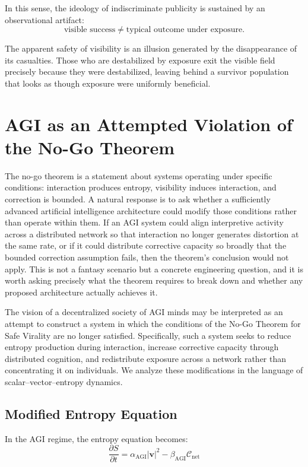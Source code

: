 \documentclass[12pt,a4paper]{article}
\begin{document}
In this sense, the ideology of indiscriminate publicity is sustained by an observational artifact:
\[
\text{visible success} \neq \text{typical outcome under exposure}.
\]

The apparent safety of visibility is an illusion generated by the disappearance of its casualties. Those who are destabilized by exposure exit the visible field precisely because they were destabilized, leaving behind a survivor population that looks as though exposure were uniformly beneficial.

\section{AGI as an Attempted Violation of the No-Go Theorem}

The no-go theorem is a statement about systems operating under specific conditions: interaction produces entropy, visibility induces interaction, and correction is bounded. A natural response is to ask whether a sufficiently advanced artificial intelligence architecture could modify those conditions rather than operate within them. If an AGI system could align interpretive activity across a distributed network so that interaction no longer generates distortion at the same rate, or if it could distribute corrective capacity so broadly that the bounded correction assumption fails, then the theorem's conclusion would not apply. This is not a fantasy scenario but a concrete engineering question, and it is worth asking precisely what the theorem requires to break down and whether any proposed architecture actually achieves it.

The vision of a decentralized society of AGI minds may be interpreted as an attempt to construct a system in which the conditions of the No-Go Theorem for Safe Virality are no longer satisfied. Specifically, such a system seeks to reduce entropy production during interaction, increase corrective capacity through distributed cognition, and redistribute exposure across a network rather than concentrating it on individuals. We analyze these modifications in the language of scalar--vector--entropy dynamics.

\subsection{Modified Entropy Equation}

In the AGI regime, the entropy equation becomes:
\[
\frac{\partial S}{\partial t}
=
\alpha_{\text{AGI}} |\mathbf{v}|^2
-
\beta_{\text{AGI}} \mathcal{C}_{\text{net}}
\]
\end{document}
